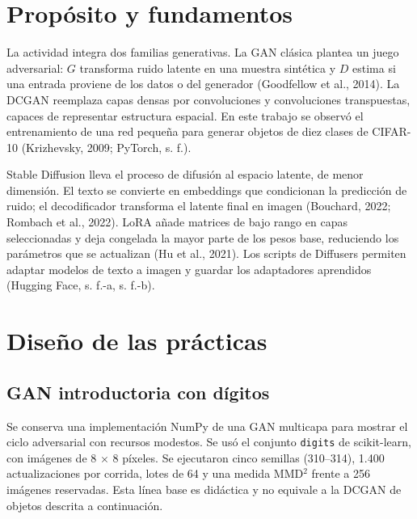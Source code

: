 \documentclass[12pt,letterpaper]{article}
\begin{document}
\section{Propósito y fundamentos}
La actividad integra dos familias generativas. La GAN clásica plantea un juego adversarial: $G$ transforma ruido latente en una muestra sintética y $D$ estima si una entrada proviene de los datos o del generador (Goodfellow et al., 2014). La DCGAN reemplaza capas densas por convoluciones y convoluciones transpuestas, capaces de representar estructura espacial. En este trabajo se observó el entrenamiento de una red pequeña para generar objetos de diez clases de CIFAR-10 (Krizhevsky, 2009; PyTorch, s. f.).\par
Stable Diffusion lleva el proceso de difusión al espacio latente, de menor dimensión. El texto se convierte en embeddings que condicionan la predicción de ruido; el decodificador transforma el latente final en imagen (Bouchard, 2022; Rombach et al., 2022). LoRA añade matrices de bajo rango en capas seleccionadas y deja congelada la mayor parte de los pesos base, reduciendo los parámetros que se actualizan (Hu et al., 2021). Los scripts de Diffusers permiten adaptar modelos de texto a imagen y guardar los adaptadores aprendidos (Hugging Face, s. f.-a, s. f.-b).

\section{Diseño de las prácticas}
\subsection{GAN introductoria con dígitos}
Se conserva una implementación NumPy de una GAN multicapa para mostrar el ciclo adversarial con recursos modestos. Se usó el conjunto \texttt{digits} de scikit-learn, con imágenes de 8 $\times$ 8 píxeles. Se ejecutaron cinco semillas (310--314), 1.400 actualizaciones por corrida, lotes de 64 y una medida MMD$^2$ frente a 256 imágenes reservadas. Esta línea base es didáctica y no equivale a la DCGAN de objetos descrita a continuación.
\end{document}
